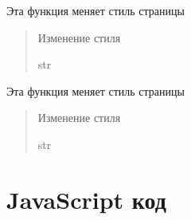 \documentclass[letterpaper,10pt,russian]{sphinxmanual}
\begin{document}

\begin{fulllineitems}
\label{\detokenize{blueprints:blueprints.style.style4}}
\pysigstartsignatures
{}
\pysigstopsignatures
\sphinxAtStartPar
Эта функция меняет стиль страницы
\begin{quote}\begin{description}
\sphinxAtStartPar
Изменение стиля

\sphinxAtStartPar
str

\end{description}\end{quote}

\end{fulllineitems}


\begin{fulllineitems}
\label{\detokenize{blueprints:blueprints.style.style5}}
\pysigstartsignatures
{}
\pysigstopsignatures
\sphinxAtStartPar
Эта функция меняет стиль страницы
\begin{quote}\begin{description}
\sphinxAtStartPar
Изменение стиля

\sphinxAtStartPar
str

\end{description}\end{quote}

\end{fulllineitems}



\chapter{JavaScript код}
\label{\detokenize{index:javascript}}
\end{document}
